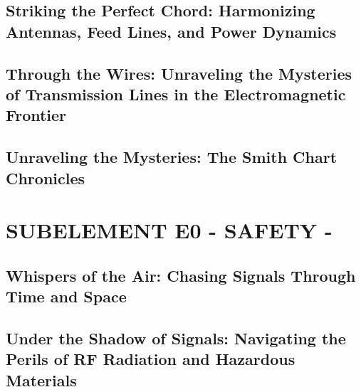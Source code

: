 \documentclass[12pt]{book}
\begin{document}
\section{Striking the Perfect Chord: Harmonizing Antennas, Feed Lines, and Power Dynamics}










\section{Through the Wires: Unraveling the Mysteries of Transmission Lines in the Electromagnetic Frontier}












\section{Unraveling the Mysteries: The Smith Chart Chronicles}











\chapter{SUBELEMENT E0 - SAFETY -}
\section{Whispers of the Air: Chasing Signals Through Time and Space}











\section{Under the Shadow of Signals: Navigating the Perils of RF Radiation and Hazardous Materials}
\end{document}

